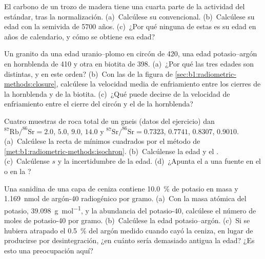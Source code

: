 \begin{exercise}[$\star$]\label{exo:b1:radiometric-methods:3}
El carbono de un trozo de madera tiene una cuarta parte de la actividad del estándar, tras la normalización. (a)~Calcúlese su  convencional. (b)~Calcúlese
su edad con la semivida de \num{5700} años. (c)~¿Por qué ninguna de estas es su edad en años de calendario, y cómo se obtiene esa edad?
\end{exercise}

\begin{exercise}[$\star$]\label{exo:b1:radiometric-methods:4}
Un granito da una edad uranio--plomo en circón de \qty{420}{\Ma}, una edad potasio--argón en hornblenda de \qty{410}{\Ma} y otra en biotita de
\qty{398}{\Ma}. (a)~¿Por qué las tres edades son distintas, y en este orden? (b)~Con las  de la figura de
\cref{sec:b1:radiometric-methods:closure}, calcúlese la velocidad media de enfriamiento entre los cierres de la hornblenda y de la biotita. (c)~¿Qué puede decirse de la velocidad de enfriamiento entre el cierre del circón y el de la hornblenda?
\end{exercise}

\begin{exercise}[$\star\star$]\label{exo:b1:radiometric-methods:5}
Cuatro muestras de roca total de un gneis (datos del ejercicio) dan
$^{87}\mathrm{Rb}/^{86}\mathrm{Sr} = 2.0$, $5.0$, $9.0$, $14.0$ y
$^{87}\mathrm{Sr}/^{86}\mathrm{Sr} = 0.7323$, $0.7741$, $0.8307$, $0.9010$.
(a)~Calcúlese la recta de mínimos cuadrados por el método de
\cref{met:b1:radiometric-methods:isochron}. (b)~Calcúlense la edad y el . (c)~Calcúlense $s$ y la incertidumbre de la edad. (d)~¿Apunta el  a una fuente en el  o en la ?
\end{exercise}

\begin{exercise}[$\star\star$]\label{exo:b1:radiometric-methods:6}
Una sanidina de una capa de ceniza contiene \qty{10.0}{\percent} de potasio en masa y \qty{1.169}{nmol} de argón-40 radiogénico por gramo. (a)~Con la masa atómica del potasio,
\qty{39.098}{g.mol^{-1}}, y la abundancia del potasio-40, calcúlese el número de moles de potasio-40 por gramo. (b)~Calcúlese la edad potasio--argón. (c)~Si se hubiera atrapado el \qty{0.5}{\percent} del argón medido cuando cayó la ceniza, en lugar de producirse por desintegración, ¿en cuánto sería demasiado antigua la edad? ¿Es esto una preocupación aquí?
\end{exercise}

